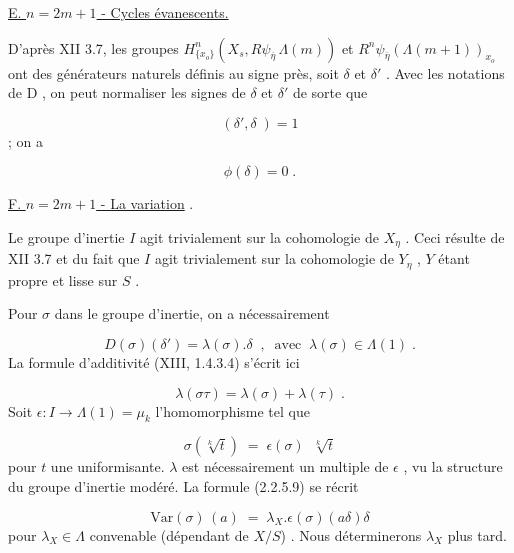 \underline{E. \quad $n = 2m + 1$ \quad - Cycles évanescents.}

D'après XII 3.7, les groupes $H^n_{\{x_o\}}(X_s,R\psi_{\overline{\eta}} \, \Lambda(m))$ et $R^n\psi_{\overline{\eta}}(\Lambda(m+1))_{x_o}$ ont des générateurs naturels définis au signe près, soit $\delta$ et $\delta'$ . Avec les notations de D , on peut normaliser les signes de $\delta$ et $\delta'$ de sorte que

\begin{equation}\tag{2.2.5.7}
(\delta',\delta \;) = 1
\end{equation}
; on a

\begin{equation}\tag{2.2.5.8}
\phi(\delta) = 0 \;.
\end{equation}

\underline{F. \quad $n = 2m + 1$ \quad - La variation} .

Le groupe d'inertie $I$ agit trivialement sur la cohomologie de $X_{\eta}$ . Ceci résulte de XII 3.7 et du fait que $I$ agit trivialement sur la cohomologie de $Y_{\eta}$ , $Y$ étant propre et lisse sur $S$ .

Pour $\sigma$ dans le groupe d'inertie, on a nécessairement

\begin{equation}\tag{2.2.5.9}
D(\sigma)(\delta') = \lambda(\sigma).\delta \;\; , \;\; \mathrm{avec} \;\; \lambda(\sigma) \in \Lambda(1) \;.
\end{equation}
La formule d'additivité (XIII, 1.4.3.4) s'écrit ici

\begin{equation*}
\lambda(\sigma\tau) = \lambda(\sigma) + \lambda(\tau) \;.
\end{equation*}
Soit $\epsilon : I \longrightarrow \Lambda(1) = \mu_k$ l'homomorphisme tel que

\begin{equation*}
\sigma(\sqrt[k]{t}) \;=\; \epsilon(\sigma) \;\; \sqrt[k]{t}
\end{equation*}
pour  $t$  une uniformisante.  $\lambda$  est nécessairement un multiple de  $\epsilon$ , vu la structure du groupe d'inertie modéré. La formule (2.2.5.9) se récrit

\begin{equation}\tag{2.2.5.10}
\mathrm{Var}(\sigma)\,(a) \;=\; \lambda_X . \epsilon(\sigma)(a\delta)\delta
\end{equation}
pour  $\lambda_X \in \Lambda$  convenable (dépendant de  $X/S$) . Nous déterminerons  $\lambda_X$  plus tard.

